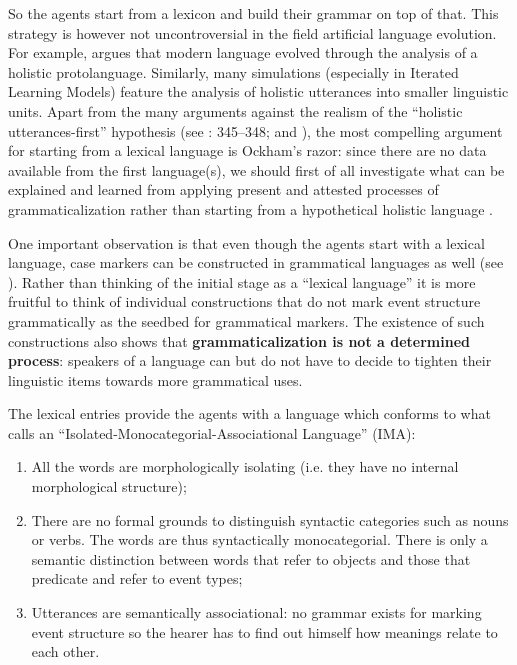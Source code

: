So the agents start from a lexicon and build their grammar on top of that. This strategy is however not uncontroversial in the field artificial language evolution. For example, \citet{wray98protolanguage, wray02transition} argues that modern language evolved through the analysis of a holistic protolanguage. Similarly, many simulations (especially in Iterated Learning Models) feature the analysis of holistic utterances into smaller linguistic units. Apart from the many arguments against the realism of the ``holistic utterances-first'' hypothesis (see \citealp{depauw02grael}: 345--348; and \citealp{wellens08flexible}), the most compelling argument for starting from a lexical language is Ockham's razor: since there are no data available from the first language(s), we should first of all investigate what can be explained and learned from applying present and attested processes of grammaticalization rather than starting from a hypothetical holistic language \citep{hoefler08reanalysis}.

One important observation is that even though the agents start with a lexical language, case markers can be constructed in grammatical languages as well (see ). Rather than thinking of the initial stage as a ``lexical language'' it is more fruitful to think of individual constructions that do not mark event structure grammatically as the seedbed for grammatical markers. The existence of such constructions also shows that {\bfseries grammaticalization is not a determined process}: speakers of a language can but do not have to decide to tighten their linguistic items towards more grammatical uses.

The lexical entries provide the agents with a language which conforms to what \citet[124]{gil08how} calls an ``Isolated-Monocategorial-Associational Language'' (IMA):

\begin{enumerate}
\item All the words are morphologically isolating (i.e. they have no internal morphological structure);
\item There are no formal grounds to distinguish syntactic categories such as nouns or verbs. The words are thus syntactically monocategorial. There is only a semantic distinction between words that refer to objects and those that predicate and refer to event types;
\item Utterances are semantically associational: no grammar exists for marking event structure so the hearer has to find out himself how meanings relate to each other.
\end{enumerate}


